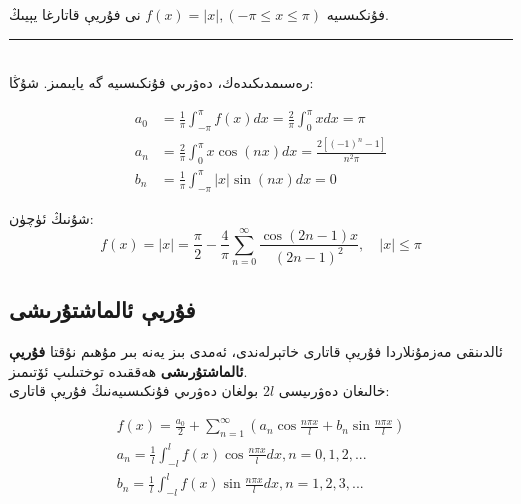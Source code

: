  \begin{myexample}
فۇنكىسىيە 
$f(x) = |x|, (-\pi \le x \le \pi)$
نى فۇريې قاتارغا يېيىڭ.
 	\\\rule{\linewidth}{0.05em}\\
 	رەسىمدىكىدەك، دەۋرىي فۇنكىسىيە گە يايىمىز. شۇڭا:\\
 	\begin{minipage}[b]{0.45\linewidth}
	\begin{align*}
	a_0 &= \frac{1}{\pi} \int_{-\pi}^{\pi}f(x) dx = \frac{2}{\pi}\int_{0}^{\pi}xdx = \pi \\
	a_n &= \frac{2}{\pi}\int_{0}^{\pi}x\cos (nx) dx = \frac{2[(-1)^n-1]}{n^2 \pi} \\
	b_n &=  \frac{1}{\pi}\int_{-\pi}^{\pi}|x|\sin (nx) dx = 0
	\end{align*}
 	\end{minipage}
 	\hfil
 	\begin{minipage}[b]{0.5\linewidth}
 	\end{minipage}
 	
 	شۇنىڭ ئۈچۈن:
 	$$
 	f(x) = |x|= \frac{\pi}{2}-\frac{4}{\pi}\sum_{n=0}^{\infty} \frac{\cos (2n-1)x}{(2n-1)^2}, \quad |x| \le \pi
 	$$
 \end{myexample}

\subsection{فۇريې ئالماشتۇرىشى}

ئالدىنقى مەزمۇنلاردا فۇريې قاتارى خاتېرلەندى، ئەمدى بىز يەنە بىر مۇھىم نۇقتا 
\textbf{فۇريې ئالماشتۇرىشى}
ھەققىدە توختىلىپ ئۆتىمىز.\\
خالىغان دەۋرىيسى $2l$ بولغان دەۋرىي فۇنكىسىيەنىڭ فۇريې قاتارى:
 
 \begin{align}
 	f(x)=\frac{a_0}{2}+\sum_{n=1}^{\infty}(a_n\cos \frac{n \pi x}{l} + b_n\sin \frac{n \pi x}{l}) \\
 	a_n = \frac{1}{l} \int_{-l}^{l}f(x) \cos \frac{n \pi x}{l} dx , n=0,1,2,... \\
 	b_n = \frac{1}{l} \int_{-l}^{l}f(x) \sin \frac{n \pi x}{l} dx , n=1,2,3,...
 \end{align}

